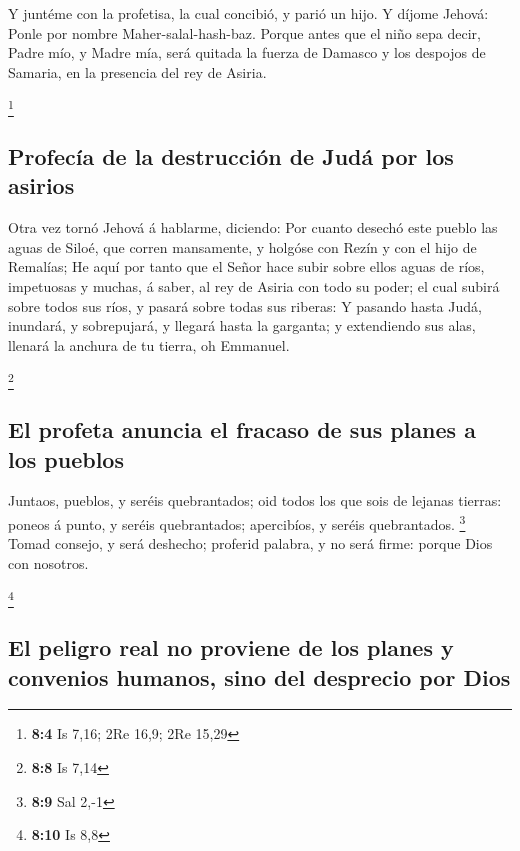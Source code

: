  Y juntéme con la profetisa, la cual concibió, y parió un
hijo. Y díjome Jehová: Ponle por nombre Maher-salal-hash-baz.
 Porque antes que el niño sepa decir, Padre mío, y Madre
mía, será quitada la fuerza de Damasco y los despojos de Samaria, en la
presencia del rey de Asiria.

\footnote{\textbf{8:4} Is 7,16; 2Re 16,9; 2Re 15,29}

\hypertarget{profecuxeda-de-la-destrucciuxf3n-de-juduxe1-por-los-asirios}{%
\subsection{Profecía de la destrucción de Judá por los
asirios}\label{profecuxeda-de-la-destrucciuxf3n-de-juduxe1-por-los-asirios}}

 Otra vez tornó Jehová á hablarme, diciendo:
 Por cuanto desechó este pueblo las aguas de Siloé, que
corren mansamente, y holgóse con Rezín y con el hijo de Remalías;
 He aquí por tanto que el Señor hace subir sobre ellos
aguas de ríos, impetuosas y muchas, á saber, al rey de Asiria con todo
su poder; el cual subirá sobre todos sus ríos, y pasará sobre todas sus
riberas:  Y pasando hasta Judá, inundará, y sobrepujará, y
llegará hasta la garganta; y extendiendo sus alas, llenará la anchura de
tu tierra, oh Emmanuel.

\footnote{\textbf{8:8} Is 7,14}

\hypertarget{el-profeta-anuncia-el-fracaso-de-sus-planes-a-los-pueblos}{%
\subsection{El profeta anuncia el fracaso de sus planes a los
pueblos}\label{el-profeta-anuncia-el-fracaso-de-sus-planes-a-los-pueblos}}

 Juntaos, pueblos, y seréis quebrantados; oid todos los
que sois de lejanas tierras: poneos á punto, y seréis quebrantados;
apercibíos, y seréis quebrantados. \footnote{\textbf{8:9} Sal 2,-1}
 Tomad consejo, y será deshecho; proferid palabra, y no
será firme: porque Dios con nosotros.

\footnote{\textbf{8:10} Is 8,8}

\hypertarget{el-peligro-real-no-proviene-de-los-planes-y-convenios-humanos-sino-del-desprecio-por-dios}{%
\subsection{El peligro real no proviene de los planes y convenios
humanos, sino del desprecio por
Dios}\label{el-peligro-real-no-proviene-de-los-planes-y-convenios-humanos-sino-del-desprecio-por-dios}}

